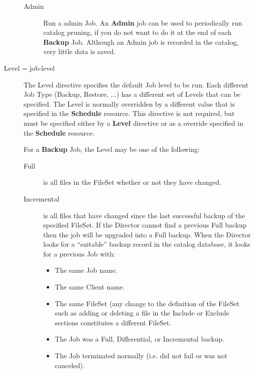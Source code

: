 \begin{description}
\begin{description}
\item [Admin]
   Run a admin Job. An {\bf Admin} job can  be used to periodically run catalog
pruning, if you  do not want to do it at the end of each {\bf Backup}  Job.
Although an Admin job is recorded in the  catalog, very little data is saved. 
\end{description}

\label{Level}

\item [Level = \lt{}job-level\gt{}]
   The Level directive specifies  the default Job level to be run. Each different
Job Type (Backup, Restore, ...) has a different set of Levels  that can be
specified. The Level is normally overridden  by a different value that is
specified in the {\bf Schedule}  resource. This directive is not required, but
must be specified either  by a {\bf Level} directive or as a override
specified in the  {\bf Schedule} resource.  

For a {\bf Backup} Job, the Level may be one of the  following:  

\begin{description}

\item [Full]
   is all files in the FileSet whether or not they  have changed.  

\item [Incremental]
   is all files that have changed since the  last successful backup of the
specified FileSet. If the  Director cannot find a previous Full backup then
the job will be  upgraded into a Full backup. When the Director looks for a 
``suitable'' backup record in the catalog database, it  looks for a previous
Job with:  

\begin{itemize}
\item The same Job name.  
\item The same Client name.  
\item The same FileSet (any change to the definition of  the FileSet such as
   adding or deleting a file in the  Include or Exclude sections constitutes a
   different FileSet.  
\item The Job was a Full, Differential, or Incremental backup.  
\item The Job terminated normally (i.e. did not fail or was not  canceled).  
   \end{itemize}


\end{description}
\end{description}
